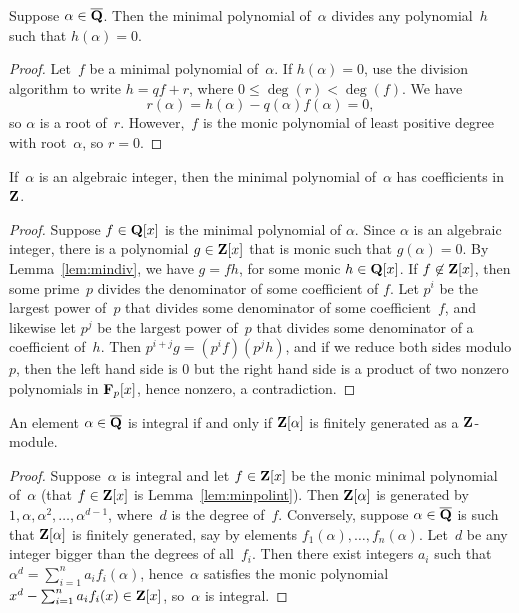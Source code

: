 \begin{lemma}\label{lem:mindiv}
  Suppose $\alpha \in\overline{\mathbf{Q}}$.  Then the minimal polynomial of~$\alpha$
  divides any polynomial~$h$ such that $h(\alpha)=0$.
\end{lemma}
\begin{proof}
  Let~$f$ be a minimal polynomial of~$\alpha$.  If $h(\alpha)=0$, use
  the division algorithm to write $h=qf + r$, where $0\leq \deg(r) <
  \deg(f)$.  We have $$r(\alpha) = h(\alpha) - q(\alpha) f(\alpha) =
  0,$$ so $\alpha$ is a root of~$r$.  However,~$f$ is the monic
  polynomial of least positive degree with root~$\alpha$, so $r=0$.
\end{proof}

\begin{lemma}\label{lem:minpolint}
If~$\alpha$ is an algebraic integer, then the minimal polynomial
of~$\alpha$ has coefficients in~$\mathbf{Z}$.
\end{lemma}
\begin{proof}
Suppose $f\in\mathbf{Q}[x]$ is the minimal polynomial of $\alpha$. 
Since $\alpha$ is an algebraic integer, there is a polynomial
$g\in\mathbf{Z}[x]$ that is monic such that $g(\alpha)=0$.
By Lemma~\ref{lem:mindiv}, we have
$g=fh$, for some monic $h\in\mathbf{Q}[x]$.  If $f\not\in\mathbf{Z}[x]$, then some prime~$p$
divides the denominator of some coefficient of $f$.  Let $p^i$ be the
largest power of~$p$ that divides some denominator of some
coefficient~$f$, and likewise let $p^j$ be the largest power of~$p$
that divides some denominator of a coefficient of~$h$.  Then $p^{i+j}g
= (p^if)(p^j h)$, and if we reduce both sides modulo $p$, then the
left hand side is $0$ but the right hand side is a product of two
nonzero polynomials in $\mathbf{F}_p[x]$, hence nonzero, a contradiction.
\end{proof}

\begin{proposition}\label{prop:intfg}
An element $\alpha\in\overline{\mathbf{Q}}$ is integral if and only if $\mathbf{Z}[\alpha]$ is
finitely generated as a $\mathbf{Z}$-module.
\end{proposition}
\begin{proof}
Suppose~$\alpha$ is integral and let $f\in\mathbf{Z}[x]$ be the monic minimal polynomial
of~$\alpha$ (that $f\in\mathbf{Z}[x]$ is Lemma~\ref{lem:minpolint}).  Then $\mathbf{Z}[\alpha]$
is generated by $1,\alpha,\alpha^2,\ldots,\alpha^{d-1}$, where~$d$ is
the degree of~$f$.   Conversely, suppose $\alpha\in\overline{\mathbf{Q}}$ is such that
$\mathbf{Z}[\alpha]$ is finitely generated, say by elements 
$f_1(\alpha), \ldots, f_n(\alpha)$.  Let~$d$ be any integer bigger
than the degrees of all~$f_i$.  Then there exist integers $a_i$ such
that $\alpha^d = \sum_{i=1}^n a_i f_i(\alpha)$, hence~$\alpha$ satisfies
the monic polynomial $x^d - \sum_{i=1}^n a_i f_i(x) \in \mathbf{Z}[x]$, so~$\alpha$
is integral.
\end{proof}

